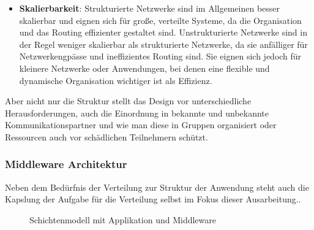 \documentclass[../vs-script-first-v01.tex]{subfiles}
\begin{document}
\begin{itemize}
\item  \textbf{Skalierbarkeit}: Strukturierte Netzwerke sind im Allgemeinen besser skalierbar und eignen sich für große, verteilte Systeme, da die Organisation und das Routing effizienter gestaltet sind.
Unstrukturierte Netzwerke sind in der Regel weniger skalierbar als strukturierte Netzwerke, da sie anfälliger für Netzwerkengpässe und ineffizientes Routing sind. Sie eignen sich jedoch für kleinere Netzwerke oder Anwendungen, bei denen eine flexible und dynamische Organisation wichtiger ist als Effizienz.
\end{itemize} 
Aber nicht nur die Struktur stellt das Design vor unterschiedliche Herausforderungen, auch die Einordnung in bekannte und unbekannte Kommunikationspartner und wie man diese in Gruppen organisiert oder Ressourcen auch vor schädlichen Teilnehmern schützt.

\subsubsection{Middleware Architektur}
Neben dem Bedürfnis der Verteilung zur Struktur der Anwendung steht auch die Kapslung der Aufgabe für die Verteilung selbst im Fokus dieser Ausarbeitung.. 

\begin{figure}[H]
    \centering
    \caption{Schichtenmodell mit Applikation und Middleware}
    \label{fig:schichtenmodell-II}
\end{figure}
\end{document}
